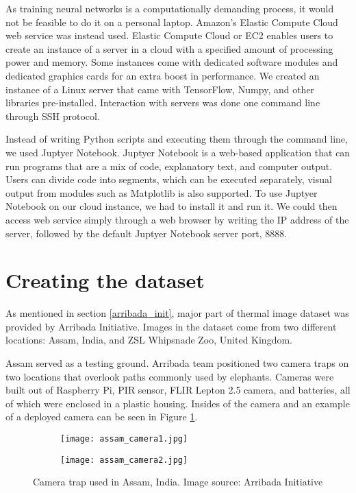 As training neural networks is a computationally demanding process, it would not be feasible to do it on a personal laptop.
Amazon's Elastic Compute Cloud web service was instead used.
Elastic Compute Cloud or EC2 enables users to create an instance of a server in a cloud with a specified amount of processing power and memory.
Some instances come with dedicated software modules and dedicated graphics cards for an extra boost in performance.
We created an instance of a Linux server that came with TensorFlow, Numpy, and other libraries pre-installed.
Interaction with servers was done one command line through SSH protocol.

Instead of writing Python scripts and executing them through the command line, we used Juptyer Notebook. 
Juptyer Notebook is a web-based application that can run programs that are a mix of code, explanatory text, and computer output.
Users can divide code into segments, which can be executed separately, visual output from modules such as Matplotlib is also supported.
To use Juptyer Notebook on our cloud instance, we had to install it and run it.
We could then access web service simply through a web browser by writing the IP address of the server, followed by the default Juptyer Notebook server port, 8888.


\section{ Creating the dataset}

As mentioned in section \ref{arribada_init}, major part of thermal image dataset was provided by Arribada Initiative\cite{wildlabs-winners}\cite{arribada-assam}.
Images in the dataset come from two different locations: Assam, India, and ZSL Whipsnade Zoo, United Kingdom.

Assam served as a testing ground.
Arribada team positioned two camera traps on two locations that overlook paths commonly used by elephants.
Cameras were built out of Raspberry Pi, PIR sensor, FLIR Lepton 2.5 camera, and batteries, all of which were enclosed in a plastic housing.
Insides of the camera and an example of a deployed camera can be seen in Figure \ref{assam_camera}.

\begin{figure}[ht]
    \begin{subfigure}{0.5\textwidth}
        \centering
        \texttt{[image: assam\_camera1.jpg]} 
    \end{subfigure}
    \begin{subfigure}{0.5\textwidth}
        \centering
        \texttt{[image: assam\_camera2.jpg]}
    \end{subfigure}
    \caption[Camera trap used in Assam, India.]{Camera trap used in Assam, India. Image source: Arribada Initiative\cite{arribada-assam}}
    \label{assam_camera}
\end{figure}

